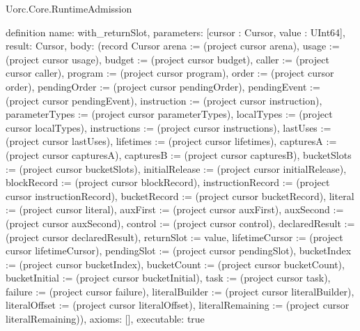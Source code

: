\begin{lexlean}{Uorc.Core.RuntimeAdmission}
\begin{semanticmodule}
definition{
  name: with_returnSlot,
  parameters: [cursor : Cursor, value : UInt64],
  result: Cursor,
  body: (record Cursor {arena := (project cursor arena), usage := (project cursor usage), budget := (project cursor budget), caller := (project cursor caller), program := (project cursor program), order := (project cursor order), pendingOrder := (project cursor pendingOrder), pendingEvent := (project cursor pendingEvent), instruction := (project cursor instruction), parameterTypes := (project cursor parameterTypes), localTypes := (project cursor localTypes), instructions := (project cursor instructions), lastUses := (project cursor lastUses), lifetimes := (project cursor lifetimes), capturesA := (project cursor capturesA), capturesB := (project cursor capturesB), bucketSlots := (project cursor bucketSlots), initialRelease := (project cursor initialRelease), blockRecord := (project cursor blockRecord), instructionRecord := (project cursor instructionRecord), bucketRecord := (project cursor bucketRecord), literal := (project cursor literal), auxFirst := (project cursor auxFirst), auxSecond := (project cursor auxSecond), control := (project cursor control), declaredResult := (project cursor declaredResult), returnSlot := value, lifetimeCursor := (project cursor lifetimeCursor), pendingSlot := (project cursor pendingSlot), bucketIndex := (project cursor bucketIndex), bucketCount := (project cursor bucketCount), bucketInitial := (project cursor bucketInitial), task := (project cursor task), failure := (project cursor failure), literalBuilder := (project cursor literalBuilder), literalOffset := (project cursor literalOffset), literalRemaining := (project cursor literalRemaining)}),
  axioms: [],
  executable: true
}


\end{semanticmodule}
\end{lexlean}
